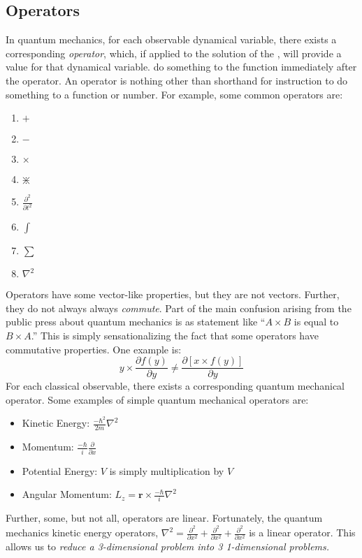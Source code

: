 	\subsection{Operators} \label{subsec:Operators}
		\begin{definition}[Operator] \label{def:Operators}
			In quantum mechanics, for each observable dynamical variable, there exists a corresponding \emph{operator}, which, if applied to the solution of the , will provide a value for that dynamical variable.
			 do something to the function immediately after the operator.
			An operator is nothing other than shorthand for instruction to do something to a function or number. For example, some common operators are:
			\begin{enumerate}
				\item $+$
				\item $-$
				\item $\times$
				\item $\divideontimes$
				\item $\frac{\partial^{2}}{\partial t^{2}}$
				\item $\int$
				\item $\sum$
				\item $\nabla^{2}$
			\end{enumerate}
			Operators have some vector-like properties, but they are not vectors.
			Further, they do not always always \emph{commute}.
			Part of the main confusion arising from the public press about quantum mechanics is as statement like ``\textellipsis $A \times B$ is equal to $B \times A$.''
			This is simply sensationalizing the fact that some operators have commutative properties.
			One example is:
			\begin{equation*}
				y \times \frac{\partial f \left( y \right)}{\partial y} \neq \frac{\partial \left[ x \times f \left( y \right) \right]}{\partial y}
			\end{equation*}
			For each classical observable, there exists a corresponding quantum mechanical operator.
			Some examples of simple quantum mechanical operators are:
			\begin{itemize}[noitemsep, nolistsep] \label{item:List of Quantum Mechanical Operators}
				\item Kinetic Energy: $\frac{-\hbar^{2}}{2m} \nabla^{2}$
				\item Momentum: $\frac{-\hbar}{i} \frac{\partial}{\partial x}$
				\item Potential Energy: $V$ is simply multiplication by $V$
				\item Angular Momentum: $L_{z} = \mathbf{r} \times \frac{-\hbar}{i} \nabla^{2}$
			\end{itemize}
			Further, some, but not all, operators are linear.
			Fortunately, the quantum mechanics kinetic energy operators, $\nabla^{2} = \frac{\partial^{2}}{\partial x^{2}} + \frac{\partial^{2}}{\partial x^{2}} + \frac{\partial^{2}}{\partial x^{2}}$ is a linear operator.
			This allows us to \emph{reduce a 3-dimensional problem into 3 1-dimensional problems.}
		\end{definition}
	
